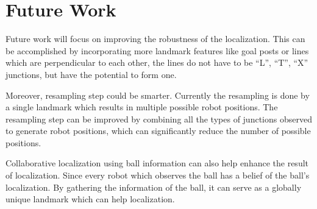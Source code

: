 \section{Future Work\label{sec:future}}
Future work will focus on improving the robustness of the localization. This can be accomplished by incorporating more landmark features like goal posts or lines which are perpendicular to each other, the lines do not have to be ``L'', ``T'', ``X'' junctions, but have the potential to form one.  

Moreover, resampling step could be smarter. Currently the resampling is done by a single landmark which results in multiple possible robot positions. The resampling step can be improved by combining all the types of junctions observed to generate robot positions, which can significantly reduce the number of possible positions.

Collaborative localization using ball information can also help enhance the result of localization. Since every robot which observes the ball has a belief of the ball's localization. By gathering the information of the ball, it can serve as a globally unique landmark which can help localization.
